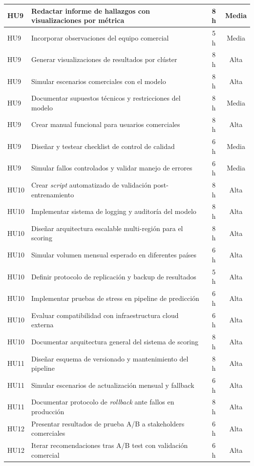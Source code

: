 \documentclass[
11pt, %
]{charter}
\begin{document}
\begin{longtable}{|p{2cm}|p{10cm}|c|c|}
HU9 & Redactar informe de hallazgos con visualizaciones por métrica & 8 h & Media \\ \hline
HU9 & Incorporar observaciones del equipo comercial & 5 h & Media \\ \hline
HU9 & Generar visualizaciones de resultados por clúster & 8 h & Alta \\ \hline
HU9 & Simular escenarios comerciales con el modelo & 8 h & Alta \\ \hline
HU9 & Documentar supuestos técnicos y restricciones del modelo & 8 h & Media \\ \hline
HU9 & Crear manual funcional para usuarios comerciales & 8 h & Alta \\ \hline
HU9 & Diseñar y testear checklist de control de calidad & 6 h & Media \\ \hline
HU9 & Simular fallos controlados y validar manejo de errores & 6 h & Media \\ \hline
HU10 & Crear \textit{script} automatizado de validación post-entrenamiento & 8 h & Alta \\ \hline
HU10 & Implementar sistema de logging y auditoría del modelo & 8 h & Alta \\ \hline
HU10 & Diseñar arquitectura escalable multi-región para el scoring & 8 h & Alta \\ \hline
HU10 & Simular volumen mensual esperado en diferentes países & 6 h & Alta \\ \hline
HU10 & Definir protocolo de replicación y backup de resultados & 5 h & Alta \\ \hline
HU10 & Implementar pruebas de stress en pipeline de predicción & 6 h & Alta \\ \hline
HU10 & Evaluar compatibilidad con infraestructura cloud externa & 6 h & Alta \\ \hline
HU10 & Documentar arquitectura general del sistema de scoring & 8 h & Alta \\ \hline
HU11 & Diseñar esquema de versionado y mantenimiento del pipeline & 8 h & Alta \\ \hline
HU11 & Simular escenarios de actualización mensual y fallback & 6 h & Alta \\ \hline
HU11 & Documentar protocolo de \textit{rollback} ante fallos en producción & 8 h & Alta \\ \hline
HU12 & Presentar resultados de prueba A/B a stakeholders comerciales & 6 h & Alta \\ \hline
HU12 & Iterar recomendaciones tras A/B test con validación comercial & 6 h & Alta \\ \hline

\end{longtable}
\end{document}
